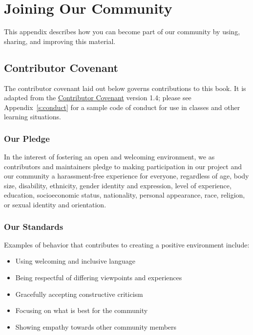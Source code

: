 \chapter{Joining Our Community}\label{s:joining}

This appendix describes how you can become part of our community by
using, sharing, and improving this material.

\section{Contributor Covenant}\label{s:joining-covenant}

The contributor covenant laid out below governs contributions to this
book. It is adapted from the \href{https://www.contributor-covenant.org}{Contributor Covenant} version
1.4; please see Appendix~\ref{s:conduct} for a sample code of conduct
for use in classes and other learning situations.

\subsection*{Our Pledge}

In the interest of fostering an open and welcoming environment, we as
contributors and maintainers pledge to making participation in our
project and our community a harassment-free experience for everyone,
regardless of age, body size, disability, ethnicity, gender identity and
expression, level of experience, education, socioeconomic status,
nationality, personal appearance, race, religion, or sexual identity and
orientation.

\subsection*{Our Standards}

Examples of behavior that contributes to creating a positive environment
include:

\begin{itemize}
\item
  Using welcoming and inclusive language
\item
  Being respectful of differing viewpoints and experiences
\item
  Gracefully accepting constructive criticism
\item
  Focusing on what is best for the community
\item
  Showing empathy towards other community members
\end{itemize}

